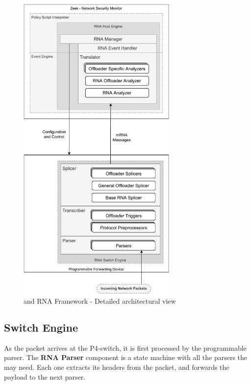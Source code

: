 \begin{figure}[H]
    \caption{\TheSolutionName{} and RNA Framework - Detailed architectural view}
    \begin{center}
        \includegraphics[width=0.7\textwidth]{images/arch_low_level.pdf}  
    \end{center}
    \label{fig:arch_low_level}
\end{figure}

\subsection{Switch Engine}

As the packet arrives at the P4-switch, it is first processed by the programmable parser. The \textbf{RNA Parser} component is a state machine with all the parsers the \Offloaders{} may need. Each one extracts its headers from the packet, and forwards the payload to the next parser.

